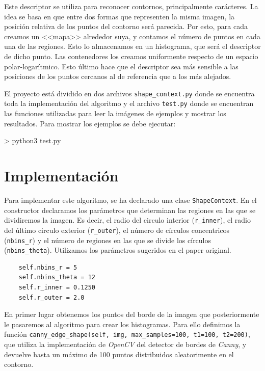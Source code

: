 \documentclass[size=a4, parskip=half, titlepage=false, toc=flat, toc=bib, 12pt]{scrartcl}
\begin{document}
Este descriptor se utiliza para reconocer contornos, principalmente carácteres. La idea se basa en que entre dos formas que representen la misma imagen, la posición relativa de los puntos del contorno será parecida. Por esto, para cada creamos un <<mapa>> alrededor suya, y contamos el número de puntos en cada una de las regiones. Esto lo almacenamos en un histograma, que será el descriptor de dicho punto. Las contenedores los creamos uniformente respecto de un espacio polar-logarítmico. Esto último hace que el descriptor sea más sensible a las posiciones de los puntos cercanos al de referencia que a los más alejados.

El proyecto está dividido en dos archivos \texttt{shape\_context.py} donde se encuentra toda la implementación del algoritmo y el archivo \texttt{test.py} donde se encuentran las funciones utilizadas para leer la imágenes de ejemplos y mostrar los resultados. Para mostrar los ejemplos
se debe ejecutar:

\begin{texttt}
> python3 test.py
\end{texttt}

\newpage

\section{Implementación}
Para implementar este algoritmo, se ha declarado una clase \verb|ShapeContext|. En el constructor declaramos los parámetros que determinan las regiones en las que se dividiremos la imagen. Es decir, el radio del circulo interior (\verb|r_inner|), el radio del último circulo exterior (\verb|r_outer|), el número de círculos concentricos (\verb|nbins_r|) y el número de regiones en las que se divide los círculos (\verb|nbins_theta|). Utilizamos los parámetros sugeridos en el paper original.

\begin{verbatim}
    self.nbins_r = 5
    self.nbins_theta = 12
    self.r_inner = 0.1250
    self.r_outer = 2.0
\end{verbatim}

En primer lugar obtenemos los puntos del borde de la imagen que posteriormente le pasaremos al algoritmo para crear los histogramas. Para ello definimos la función \texttt{canny\_edge\_shape(self, img, max\_samples=100, t1=100, t2=200)}, que utiliza la implementación de \textit{OpenCV} del detector de bordes de \textit{Canny}, y devuelve hasta un máximo de 100 puntos distribuidos aleatorimente en el contorno.
\end{document}
